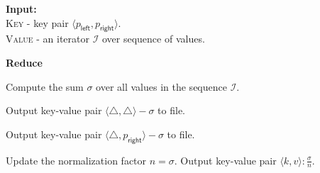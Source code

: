 \begin{frame}


\begin{algorithm}[H]
	\label{alg: reducer}

	\begin{scriptsize}
	
	\vspace{1ex}\noindent\textbf{Input:}\\
		\textsc{Key} - key pair $\langle p_{\mathsf{left}}, p_{\mathsf{right}} \rangle$.\\
		\textsc{Value} - an iterator $\mathcal{I}$ over sequence of values.
		
	
	\vspace{1ex}\noindent\textbf{Reduce}
	\begin{algorithmic}[1]
          \STATE \alert<1>{Compute the sum $\sigma$} over all values in the sequence $\mathcal{I}$.

				\STATE Output key-value pair $\langle \triangle, \triangle \rangle - \sigma$ to file.


			\ELSE
				\STATE \alert<3>{Output key-value pair $\langle \triangle, p_{\mathsf{right}} \rangle - \sigma$ to file.}


			\ENDIF
		\ELSE
				\STATE Update the normalization factor $n=\sigma$.
				\label{reducer step: collect marginal distribution}
			\ELSE
				\STATE \alert<2>{Output key-value pair $\langle k, v \rangle : \frac{\sigma}{n}$.}
			\ENDIF
		\ENDIF
	\end{algorithmic}

	\end{scriptsize}
\end{algorithm}

\end{frame}
